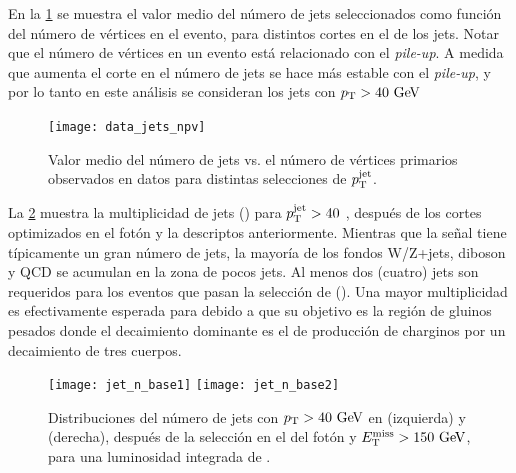 En la \cref{fig:jets_npv} se muestra el valor medio del número de jets
seleccionados como función del número de vértices en el evento, para distintos
cortes en el {\pt} de los jets. Notar que el número de vértices en un evento
está relacionado con el \emph{pile-up}. A medida que aumenta el corte en {\pt}
el número de jets se hace más estable con el \emph{pile-up}, y por lo tanto en
este análisis se consideran los jets con $\pt>40\gev$


\begin{figure}[!h]
  \centering
  \texttt{[image: data\_jets\_npv]}
  \caption{Valor medio del número de jets vs. el número de vértices primarios
    observados en datos para distintas selecciones de $p_{\mathrm{T}}^{\mathrm{jet}}$.}
    \label{fig:jets_npv}
\end{figure}


La \cref{fig:opt_jet_n} muestra la multiplicidad de jets (\njets)
para $p_{\mathrm{T}}^{\mathrm{jet}} > 40$ \gev, después de los cortes optimizados en el
fotón y la {\met} descriptos anteriormente. Mientras que la señal tiene
típicamente un gran número de jets, la mayoría de los fondos W/Z+jets, diboson y
QCD se acumulan en la zona de pocos jets. Al menos dos (cuatro) jets son
requeridos para los eventos que pasan la selección de {\SRL} ({\SRH}). Una mayor
multiplicidad es efectivamente esperada para {\SRL} debido a que su objetivo es
la región de gluinos pesados donde el decaimiento dominante es el de producción
de charginos por un decaimiento de tres cuerpos.

\begin{figure}[!h]
  \centering
  \texttt{[image: jet\_n\_base1]}
  \texttt{[image: jet\_n\_base2]}
  \caption{Distribuciones del número de jets con $\pt > 40 \gev$ en {\SRL} (izquierda) y {\SRH} (derecha),
    después de la selección en el {\pt} del fotón y $\met > 150\gev$,
    para una luminosidad integrada de {\ilumi}.}
  \label{fig:opt_jet_n}
\end{figure}


